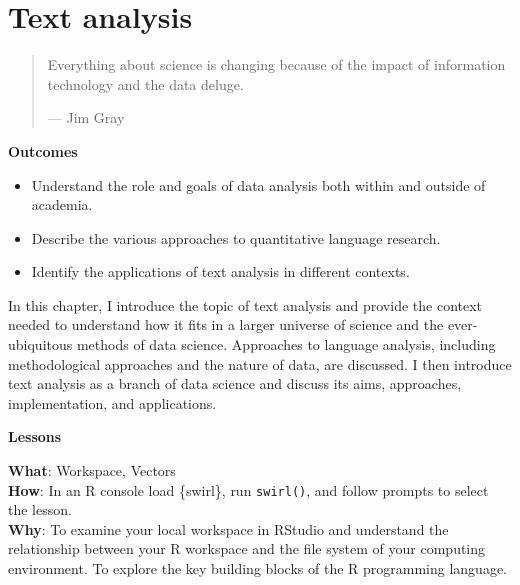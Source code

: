 \documentclass[
  letterpaper,
]{latex/krantz}
\providecommand{\tightlist}{%
  \setlength{\itemsep}{0pt}\setlength{\parskip}{0pt}}\usepackage{longtable,booktabs,array}
\theoremstyle{definition}
\theoremstyle{remark}
\begin{document}
\chapter{Text analysis}\label{sec-text-chapter}

\begin{quote}
Everything about science is changing because of the impact of
information technology and the data deluge.

--- Jim Gray
\end{quote}

\begin{tcolorbox}[enhanced jigsaw, colback=white, opacityback=0, bottomrule=.15mm, rightrule=.15mm, breakable, left=2mm, arc=.35mm, colframe=quarto-callout-color-frame, leftrule=.75mm, toprule=.15mm]

\textbf{ Outcomes}

\begin{itemize}
\tightlist
\item
  Understand the role and goals of data analysis both within and outside
  of academia.
\item
  Describe the various approaches to quantitative language research.
\item
  Identify the applications of text analysis in different contexts.
\end{itemize}

\end{tcolorbox}

In this chapter, I introduce the topic of text analysis and provide the
context needed to understand how it fits in a larger universe of science
and the ever-ubiquitous methods of data science. Approaches to language
analysis, including methodological approaches and the nature of data,
are discussed. I then introduce text analysis as a branch of data
science and discuss its aims, approaches, implementation, and
applications.

\begin{tcolorbox}[enhanced jigsaw, colback=white, opacityback=0, bottomrule=.15mm, rightrule=.15mm, breakable, left=2mm, arc=.35mm, colframe=quarto-callout-color-frame, leftrule=.75mm, toprule=.15mm]

\textbf{ Lessons}

\textbf{What}: Workspace, Vectors\\
\textbf{How}: In an R console load \{swirl\}, run \texttt{swirl()}, and
follow prompts to select the lesson.\\
\textbf{Why}: To examine your local workspace in RStudio and understand
the relationship between your R workspace and the file system of your
computing environment. To explore the key building blocks of the R
programming language.

\end{tcolorbox}
\end{document}
